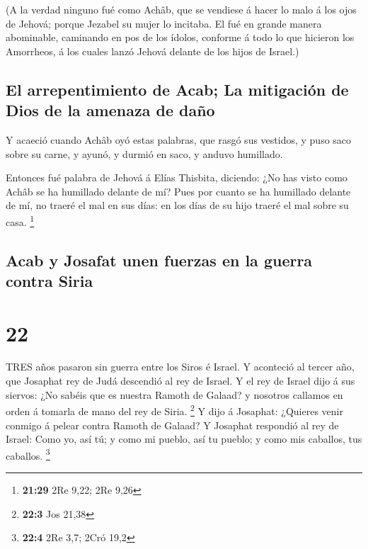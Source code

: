  (A la verdad ninguno fué como Achâb, que se vendiese á
hacer lo malo á los ojos de Jehová; porque Jezabel su mujer lo incitaba.
 El fué en grande manera abominable, caminando en pos de
los ídolos, conforme á todo lo que hicieron los Amorrheos, á los cuales
lanzó Jehová delante de los hijos de Israel.)

\hypertarget{el-arrepentimiento-de-acab-la-mitigaciuxf3n-de-dios-de-la-amenaza-de-dauxf1o}{%
\subsection{El arrepentimiento de Acab; La mitigación de Dios de la
amenaza de
daño}\label{el-arrepentimiento-de-acab-la-mitigaciuxf3n-de-dios-de-la-amenaza-de-dauxf1o}}

 Y acaeció cuando Achâb oyó estas palabras, que rasgó sus
vestidos, y puso saco sobre su carne, y ayunó, y durmió en saco, y
anduvo humillado.

 Entonces fué palabra de Jehová á Elías Thisbita, diciendo:
 ¿No has visto como Achâb se ha humillado delante de mí?
Pues por cuanto se ha humillado delante de mí, no traeré el mal en sus
días: en los días de su hijo traeré el mal sobre su casa. \footnote{\textbf{21:29}
  2Re 9,22; 2Re 9,26}

\hypertarget{acab-y-josafat-unen-fuerzas-en-la-guerra-contra-siria}{%
\subsection{Acab y Josafat unen fuerzas en la guerra contra
Siria}\label{acab-y-josafat-unen-fuerzas-en-la-guerra-contra-siria}}

\hypertarget{section-21}{%
\section{22}\label{section-21}}

 TRES años pasaron sin guerra entre los Siros é Israel.
 Y aconteció al tercer año, que Josaphat rey de Judá
descendió al rey de Israel.  Y el rey de Israel dijo á sus
siervos: ¿No sabéis que es nuestra Ramoth de Galaad? y nosotros callamos
en orden á tomarla de mano del rey de Siria. \footnote{\textbf{22:3} Jos
  21,38}  Y dijo á Josaphat: ¿Quieres venir conmigo á pelear
contra Ramoth de Galaad? Y Josaphat respondió al rey de Israel: Como yo,
así tú; y como mi pueblo, así tu pueblo; y como mis caballos, tus
caballos. \footnote{\textbf{22:4} 2Re 3,7; 2Cró 19,2}

